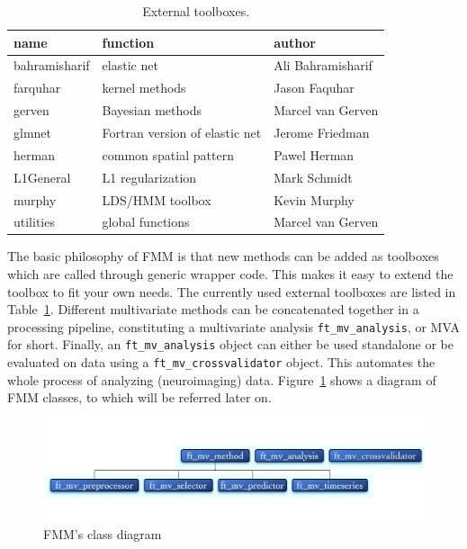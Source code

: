 \documentclass{article}
\renewcommand{\t}[1]{{\tt #1}}
\begin{document}
\begin{table}[ht]
\centering
\caption{External toolboxes.}
\begin{tabular}{l|l|l}
{\bf name} & {\bf function} & {\bf author}\\
\hline
bahramisharif & elastic net & Ali Bahramisharif  \\
farquhar & kernel methods & Jason Faquhar\\
gerven & Bayesian methods & Marcel van Gerven\\
glmnet & Fortran version of elastic net & Jerome Friedman\\
herman & common spatial pattern & Pawel Herman\\
L1General & L1 regularization & Mark Schmidt\\
murphy & LDS/HMM toolbox & Kevin Murphy\\
utilities & global functions & Marcel van Gerven
\end{tabular}
\label{tab:external}
\end{table}


The basic philosophy of FMM is that new methods can be added as toolboxes which are called through generic wrapper code. This makes it easy to extend the toolbox to fit your own needs. The currently used external toolboxes are listed in Table~\ref{tab:external}. Different multivariate methods can be concatenated together in a processing pipeline, constituting a multivariate analysis \t{ft\_mv\_analysis}, or MVA for short. Finally, an \t{ft\_mv\_analysis} object can either be used standalone or be evaluated on data using a \t{ft\_mv\_crossvalidator} object. This automates the whole process of analyzing (neuroimaging) data. Figure~\ref{class} shows a diagram of FMM classes, to which will be referred later on. 

\begin{figure}[ht]
\begin{center}
\includegraphics[width=\textwidth]{figures/classes.pdf}
\caption{FMM's class diagram}
\end{center}
\label{class}
\end{figure}

\newpage
\end{document}

